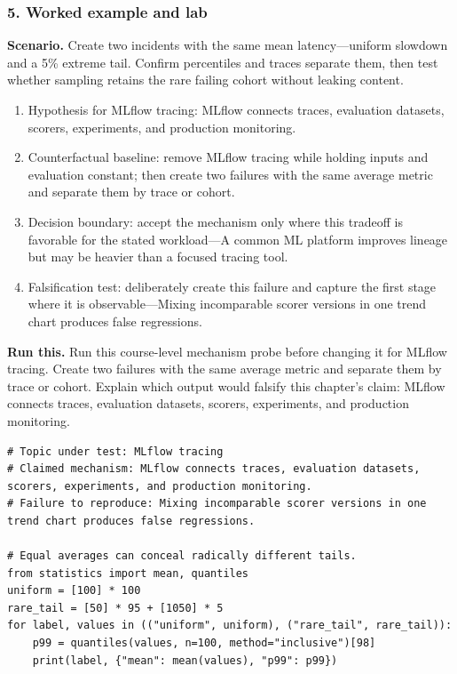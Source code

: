 \subsubsection*{5. Worked example and lab}
\textbf{Scenario.} Create two incidents with the same mean latency—uniform slowdown and a 5\% extreme tail. Confirm percentiles and traces separate them, then test whether sampling retains the rare failing cohort without leaking content.
\begin{enumerate}
\item Hypothesis for MLflow tracing: MLflow connects traces, evaluation datasets, scorers, experiments, and production monitoring.
\item Counterfactual baseline: remove MLflow tracing while holding inputs and evaluation constant; then create two failures with the same average metric and separate them by trace or cohort.
\item Decision boundary: accept the mechanism only where this tradeoff is favorable for the stated workload—A common ML platform improves lineage but may be heavier than a focused tracing tool.
\item Falsification test: deliberately create this failure and capture the first stage where it is observable—Mixing incomparable scorer versions in one trend chart produces false regressions.
\end{enumerate}
\textbf{Run this.} Run this course-level mechanism probe before changing it for MLflow tracing. Create two failures with the same average metric and separate them by trace or cohort. Explain which output would falsify this chapter's claim: MLflow connects traces, evaluation datasets, scorers, experiments, and production monitoring.
\begin{Verbatim}[fontsize=\scriptsize]
# Topic under test: MLflow tracing
# Claimed mechanism: MLflow connects traces, evaluation datasets, scorers, experiments, and production monitoring.
# Failure to reproduce: Mixing incomparable scorer versions in one trend chart produces false regressions.

# Equal averages can conceal radically different tails.
from statistics import mean, quantiles
uniform = [100] * 100
rare_tail = [50] * 95 + [1050] * 5
for label, values in (("uniform", uniform), ("rare_tail", rare_tail)):
    p99 = quantiles(values, n=100, method="inclusive")[98]
    print(label, {"mean": mean(values), "p99": p99})
\end{Verbatim}
